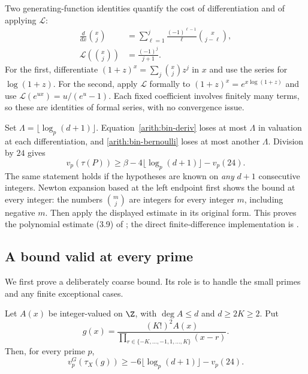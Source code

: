 Two generating-function identities quantify the cost of differentiation
and of applying $\mathcal L$:
\begin{align}
 \frac{d}{dx}\binom{x}{j}
 &=\sum_{\ell=1}^j\frac{(-1)^{\ell-1}}{\ell}
                   \binom{x}{j-\ell},\label{arith:bin-deriv}\\
 \mathcal L\!\left(\binom{x}{j}\right)&=\frac{(-1)^j}{j+1}.
 \label{arith:bin-bernoulli}
\end{align}
For the first, differentiate
$(1+z)^x=\sum_j\binom{x}{j}z^j$ in $x$ and use the series for
$\log(1+z)$. For the second, apply $\mathcal L$ formally to
$(1+z)^x=e^{x\log(1+z)}$ and use
$\mathcal L(e^{ux})=u/(e^u-1)$.
Each fixed coefficient involves finitely many terms, so these are
identities of formal series, with no convergence issue.

Set $\Lambda=\lfloor\log_p(d+1)\rfloor$.
Equation~\eqref{arith:bin-deriv} loses at most $\Lambda$ in valuation
at each differentiation, and \eqref{arith:bin-bernoulli} loses at most
another $\Lambda$. Division by $24$ gives
\begin{equation}\label{arith:taupoly}
 v_p(\tau(P))\ge
 \beta-4\lfloor\log_p(d+1)\rfloor-v_p(24).
\end{equation}
The same statement holds if the hypotheses are known on
\emph{any} $d+1$ consecutive integers. Newton expansion based at the
left endpoint first shows the bound at every integer: the numbers
$\binom{m}{j}$ are integers for every integer $m$, including negative
$m$. Then apply the displayed estimate in its original form.
This proves the polynomial estimate (3.9) of
\cite[\S3.3]{fauzan}; the direct finite-difference implementation is
\cite[\texttt{BinomBasis.lean}, \texttt{TauBound.lean},
\texttt{SmallPrime.lean}]{firsching}.

\subsection{A bound valid at every prime}

We first prove a deliberately coarse bound. Its role is to handle
the small primes and any finite exceptional cases.

\begin{lemma}\label{arith:crude-tau}
Let $A(x)$ be integer-valued on $\Z$, with $\deg A\le d$ and
$d\ge2K\ge2$. Put
\[
 g(x)=\frac{(K!)^2A(x)}
             {\prod_{r\in\{-K,\ldots,-1,1,\ldots,K\}}(x-r)}.
\]
Then, for every prime $p$,
\[
 v_p^G(\tau_X(g))
 \ge-6\lfloor\log_p(d+1)\rfloor-v_p(24).
\]
\end{lemma}

